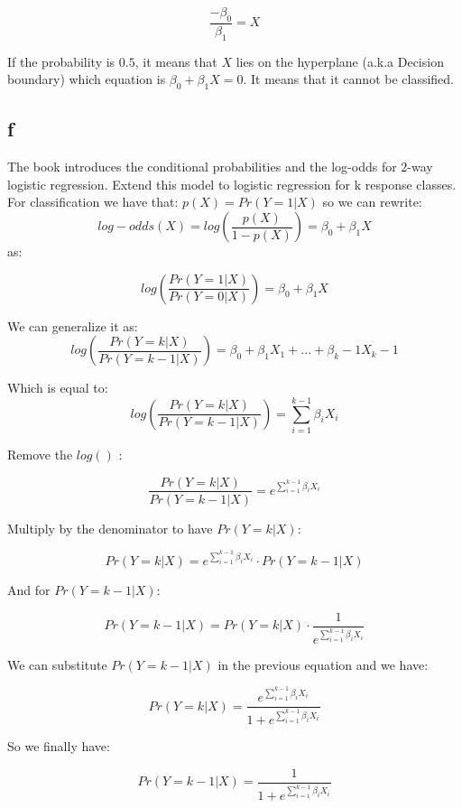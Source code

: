 \[ \frac{-\beta_0}{\beta_1} = X \]

If the probability is $0.5 $, it means that $X$ lies on the hyperplane (a.k.a Decision boundary) which equation is $ \beta_0 + \beta_1 X = 0 $. It means that it cannot be classified. 

\subsection*{f}

The book introduces the conditional probabilities and the log-odds for 2-way logistic regression. Extend this model to logistic regression for k response classes.\\

For classification we have that: $ p(X) = Pr(Y = 1 | X)$ so we can rewrite:\\
\[ log-odds(X) = log(\frac{p(X)}{1 - p(X)}) = \beta_0 + \beta_1 X   \]
as:

\[ log(\frac{Pr(Y = 1 | X)}{Pr(Y = 0 | X)}) = \beta_0 + \beta_1 X  \]

We can generalize it as:
\[ log(\frac{Pr(Y = k | X)}{Pr(Y = k-1 | X)}) = \beta_0 + \beta_1 X_1 + ... + \beta_k-1 X_k-1  \]

Which is equal to:
\[ log(\frac{Pr(Y = k | X)}{Pr(Y = k-1 | X)}) = \sum_{i = 1}^{k-1} \beta_i X_i  \]

Remove the $ log()$ :

\[ \frac{Pr(Y = k | X)}{Pr(Y = k-1 | X)} = e^{\sum_{i = 1}^{k-1} \beta_i X_i} \]  

Multiply by the denominator to have $ Pr(Y = k | X) $: 

\[ Pr(Y = k | X) = e^{\sum_{i = 1}^{k-1} \beta_i X_i} \cdot Pr(Y = k-1 | X) \]

And for $ Pr(Y = k-1 | X) $: 

\[ Pr(Y = k-1 | X) = Pr(Y = k | X) \cdot \frac{1}{e^{\sum_{i = 1}^{k-1} \beta_i X_i}} \] 

We can substitute $ Pr(Y = k - 1 | X) $ in the previous equation and we have:

\[ Pr(Y = k | X) = \frac{e^{\sum_{i = 1}^{k-1} \beta_i X_i}}{1 + e^{\sum_{i = 1}^{k-1} \beta_i X_i}} \]

So we finally have: 

\[ Pr(Y = k-1 | X) = \frac{1}{1 + e^{\sum_{i = 1}^{k-1} \beta_i X_i}} \]



